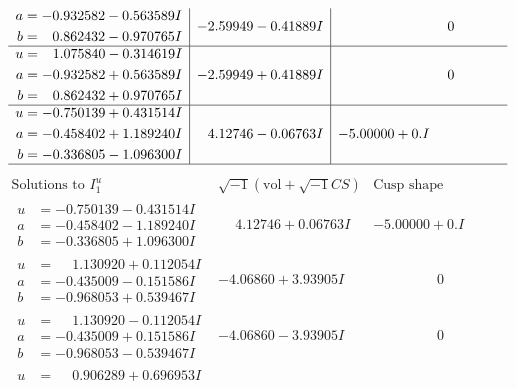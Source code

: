 \documentclass[1p]{elsarticle_modified}
\theoremstyle{definition}
\newcommand{\I}{\sqrt{-1}}
\begin{document}
$$\begin{array}{c|c|c}
\begin{aligned}
a &= -0.932582 - 0.563589 I \\
b &= \phantom{-}0.862432 - 0.970765 I\end{aligned}
 & -2.59949 - 0.41889 I & \phantom{-0.000000 } 0 \\ \hline\begin{aligned}
u &= \phantom{-}1.075840 - 0.314619 I \\
a &= -0.932582 + 0.563589 I \\
b &= \phantom{-}0.862432 + 0.970765 I\end{aligned}
 & -2.59949 + 0.41889 I & \phantom{-0.000000 } 0 \\ \hline\begin{aligned}
u &= -0.750139 + 0.431514 I \\
a &= -0.458402 + 1.189240 I \\
b &= -0.336805 - 1.096300 I\end{aligned}
 & \phantom{-}4.12746 - 0.06763 I & -5.00000 + 0. I\phantom{ +0.000000I}\\
 \hline 
 \end{array}$$\newpage$$\begin{array}{c|c|c}  
\text{Solutions to }I^u_{1}& \I (\text{vol} + \sqrt{-1}CS) & \text{Cusp shape}\\
 \hline 
\begin{aligned}
u &= -0.750139 - 0.431514 I \\
a &= -0.458402 - 1.189240 I \\
b &= -0.336805 + 1.096300 I\end{aligned}
 & \phantom{-}4.12746 + 0.06763 I & -5.00000 + 0. I\phantom{ +0.000000I} \\ \hline\begin{aligned}
u &= \phantom{-}1.130920 + 0.112054 I \\
a &= -0.435009 - 0.151586 I \\
b &= -0.968053 + 0.539467 I\end{aligned}
 & -4.06860 + 3.93905 I & \phantom{-0.000000 } 0 \\ \hline\begin{aligned}
u &= \phantom{-}1.130920 - 0.112054 I \\
a &= -0.435009 + 0.151586 I \\
b &= -0.968053 - 0.539467 I\end{aligned}
 & -4.06860 - 3.93905 I & \phantom{-0.000000 } 0 \\ \hline\begin{aligned}
u &= \phantom{-}0.906289 + 0.696953 I \\

\end{aligned}
\end{array}$$
\end{document}
